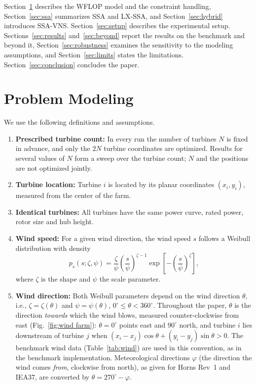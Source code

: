 \documentclass[journal,twoside]{IEEEtran}
\begin{document}
Section~\ref{sec:model} describes the WFLOP model and the constraint handling, Section~\ref{sec:ssa} summarizes SSA and LX-SSA, and Section~\ref{sec:hybrid} introduces SSA-VNS. Section~\ref{sec:setup} describes the experimental setup. Sections~\ref{sec:results} and~\ref{sec:beyond} report the results on the benchmark and beyond it, Section~\ref{sec:robustness} examines the sensitivity to the modeling assumptions, and Section~\ref{sec:limits} states the limitations. Section~\ref{sec:conclusion} concludes the paper.

\section{Problem Modeling}
\label{sec:model}

We use the following definitions and assumptions.
\begin{enumerate}
    \item \textbf{Prescribed turbine count:} In every run the number of turbines $N$ is fixed in advance, and only the $2N$ turbine coordinates are optimized. Results for several values of $N$ form a sweep over the turbine count; $N$ and the positions are not optimized jointly.
    \item \textbf{Turbine location:} Turbine $i$ is located by its planar coordinates $(x_i,y_i)$, measured from the center of the farm.
    \item \textbf{Identical turbines:} All turbines have the same power curve, rated power, rotor size and hub height.
    \item \textbf{Wind speed:} For a given wind direction, the wind speed $s$ follows a Weibull distribution with density
    \[
        p_s (s;\zeta,\psi) = \frac{\zeta}{\psi} \left( \frac{s}{\psi} \right)^{\zeta-1} \exp\left[-\left( \frac{s}{\psi} \right)^\zeta \right],
    \]
    where $\zeta$ is the shape and $\psi$ the scale parameter.
    \item \textbf{Wind direction:} Both Weibull parameters depend on the wind direction $\theta$, i.e., $\zeta=\zeta(\theta)$ and $\psi=\psi(\theta)$, $0^\circ\le\theta<360^\circ$. Throughout the paper, $\theta$ is the direction \emph{towards} which the wind blows, measured counter-clockwise from east (Fig.~\ref{fig:wind farm}): $\theta=0^\circ$ points east and $90^\circ$ north, and turbine $i$ lies downstream of turbine $j$ when $(x_i-x_j)\cos\theta+(y_i-y_j)\sin\theta>0$. The benchmark wind data (Table~\ref{tab:wind}) are used in this convention, as in the benchmark implementation. Meteorological directions $\varphi$ (the direction the wind comes \emph{from}, clockwise from north), as given for Horns Rev~1 and IEA37, are converted by $\theta=270^\circ-\varphi$.

\end{enumerate}
\end{document}
